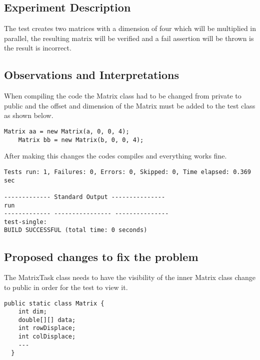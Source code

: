 
\subsection{Experiment Description} 
\par
The test creates two matrices with a dimension of four which will be multiplied in parallel, the resulting matrix will be verified and a fail assertion will be thrown is the result is incorrect.
\par


\subsection{Observations and Interpretations}

\par
When compiling the code the Matrix class had to be changed from private to public and the offset and dimension of the Matrix must be added to the test class as shown below.
\begin{lstlisting}[frame=single,breaklines=true]
    Matrix aa = new Matrix(a, 0, 0, 4);
    Matrix bb = new Matrix(b, 0, 0, 4);
\end{lstlisting}
After making this changes the codes compiles and everything works fine.
\par
\begin{lstlisting}[frame=single,breaklines=true]
Tests run: 1, Failures: 0, Errors: 0, Skipped: 0, Time elapsed: 0.369 sec

------------- Standard Output ---------------
run
------------- ---------------- ---------------
test-single:
BUILD SUCCESSFUL (total time: 0 seconds)
\end{lstlisting}


\subsection{Proposed changes to fix the problem}

\par
The MatrixTask class needs to have the visibility of the inner Matrix class change to public in order for the test to view it.
\begin{lstlisting}[frame=single,breaklines=true]
  public static class Matrix {
    int dim;
    double[][] data;
    int rowDisplace;
    int colDisplace;
    ---
  }
\end{lstlisting}
